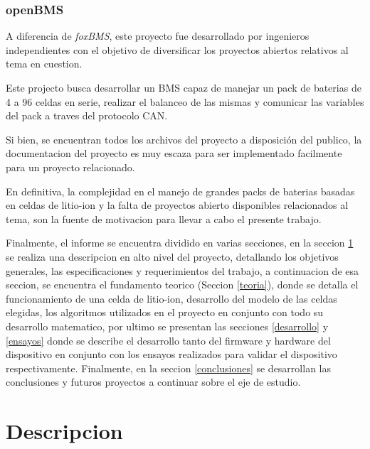 \documentclass[10pt,a4paper]{article}
\begin{document}
    \subsubsection{openBMS}

    A diferencia de \emph{foxBMS}, este proyecto fue desarrollado por 
    ingenieros independientes con el objetivo de diversificar los proyectos 
    abiertos relativos al tema en cuestion.
    
    \noindent Este projecto busca desarrollar un \acrshort{BMS} capaz de manejar un pack 
    de baterias de 4 a 96 celdas en serie, realizar el balanceo de las mismas y 
    comunicar las variables del pack a traves del protocolo \acrshort{CAN}.
    
    \noindent Si bien, se encuentran todos los archivos del proyecto a 
    disposición del publico, la documentacion del proyecto es muy escaza 
    para ser implementado facilmente para un proyecto relacionado.
    
    \noindent En definitiva, la complejidad en el manejo de grandes packs de 
    baterias basadas en celdas de litio-ion y la falta de proyectos abierto 
    disponibles relacionados al tema, son la fuente de motivacion para 
    llevar a cabo el presente trabajo.
    
    \noindent Finalmente, el informe se encuentra dividido en varias secciones, en la
    seccion \ref{descripcion} se realiza una descripcion en alto nivel del
    proyecto, detallando los objetivos generales, las especificaciones y
    requerimientos del trabajo, a continuacion de esa seccion, se encuentra el
    fundamento teorico (Seccion \ref{teoria}), donde se detalla el 
    funcionamiento de una celda de litio-ion, desarrollo del modelo de las 
    celdas elegidas, los algoritmos utilizados en el proyecto en conjunto con 
    todo su desarrollo matematico, por ultimo se presentan las secciones 
    \ref{desarrollo} y \ref{ensayos} donde se describe el desarrollo tanto del 
    firmware y hardware del dispositivo en conjunto con los ensayos realizados 
    para validar el dispositivo respectivamente. Finalmente, en la seccion 
    \ref{conclusiones} se desarrollan las conclusiones y futuros proyectos a 
    continuar sobre el eje de estudio.
	
	\clearpage
	
    \section{Descripcion}\label{descripcion}
	
\end{document}
